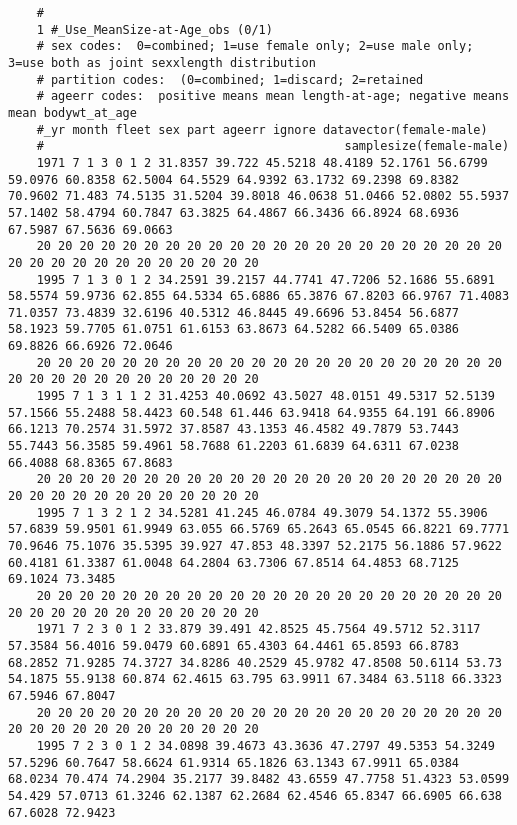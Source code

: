 \begin{landscape}
{\begin{verbatim}
	#
	1 #_Use_MeanSize-at-Age_obs (0/1)
	# sex codes:  0=combined; 1=use female only; 2=use male only; 3=use both as joint sexxlength distribution
	# partition codes:  (0=combined; 1=discard; 2=retained
	# ageerr codes:  positive means mean length-at-age; negative means mean bodywt_at_age
	#_yr month fleet sex part ageerr ignore datavector(female-male)
	#                                          samplesize(female-male)
	1971 7 1 3 0 1 2 31.8357 39.722 45.5218 48.4189 52.1761 56.6799 59.0976 60.8358 62.5004 64.5529 64.9392 63.1732 69.2398 69.8382 70.9602 71.483 74.5135 31.5204 39.8018 46.0638 51.0466 52.0802 55.5937 57.1402 58.4794 60.7847 63.3825 64.4867 66.3436 66.8924 68.6936 67.5987 67.5636 69.0663
	20 20 20 20 20 20 20 20 20 20 20 20 20 20 20 20 20 20 20 20 20 20 20 20 20 20 20 20 20 20 20 20 20 20
	1995 7 1 3 0 1 2 34.2591 39.2157 44.7741 47.7206 52.1686 55.6891 58.5574 59.9736 62.855 64.5334 65.6886 65.3876 67.8203 66.9767 71.4083 71.0357 73.4839 32.6196 40.5312 46.8445 49.6696 53.8454 56.6877 58.1923 59.7705 61.0751 61.6153 63.8673 64.5282 66.5409 65.0386 69.8826 66.6926 72.0646
	20 20 20 20 20 20 20 20 20 20 20 20 20 20 20 20 20 20 20 20 20 20 20 20 20 20 20 20 20 20 20 20 20 20
	1995 7 1 3 1 1 2 31.4253 40.0692 43.5027 48.0151 49.5317 52.5139 57.1566 55.2488 58.4423 60.548 61.446 63.9418 64.9355 64.191 66.8906 66.1213 70.2574 31.5972 37.8587 43.1353 46.4582 49.7879 53.7443 55.7443 56.3585 59.4961 58.7688 61.2203 61.6839 64.6311 67.0238 66.4088 68.8365 67.8683
	20 20 20 20 20 20 20 20 20 20 20 20 20 20 20 20 20 20 20 20 20 20 20 20 20 20 20 20 20 20 20 20 20 20
	1995 7 1 3 2 1 2 34.5281 41.245 46.0784 49.3079 54.1372 55.3906 57.6839 59.9501 61.9949 63.055 66.5769 65.2643 65.0545 66.8221 69.7771 70.9646 75.1076 35.5395 39.927 47.853 48.3397 52.2175 56.1886 57.9622 60.4181 61.3387 61.0048 64.2804 63.7306 67.8514 64.4853 68.7125 69.1024 73.3485
	20 20 20 20 20 20 20 20 20 20 20 20 20 20 20 20 20 20 20 20 20 20 20 20 20 20 20 20 20 20 20 20 20 20
	1971 7 2 3 0 1 2 33.879 39.491 42.8525 45.7564 49.5712 52.3117 57.3584 56.4016 59.0479 60.6891 65.4303 64.4461 65.8593 66.8783 68.2852 71.9285 74.3727 34.8286 40.2529 45.9782 47.8508 50.6114 53.73 54.1875 55.9138 60.874 62.4615 63.795 63.9911 67.3484 63.5118 66.3323 67.5946 67.8047
	20 20 20 20 20 20 20 20 20 20 20 20 20 20 20 20 20 20 20 20 20 20 20 20 20 20 20 20 20 20 20 20 20 20
	1995 7 2 3 0 1 2 34.0898 39.4673 43.3636 47.2797 49.5353 54.3249 57.5296 60.7647 58.6624 61.9314 65.1826 63.1343 67.9911 65.0384 68.0234 70.474 74.2904 35.2177 39.8482 43.6559 47.7758 51.4323 53.0599 54.429 57.0713 61.3246 62.1387 62.2684 62.4546 65.8347 66.6905 66.638 67.6028 72.9423

\end{verbatim}}
\end{landscape}
